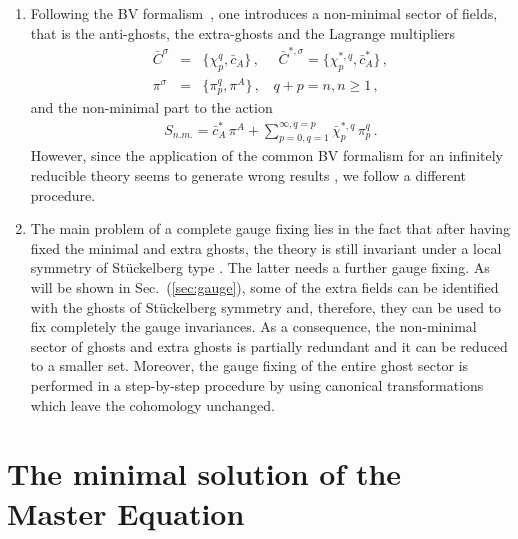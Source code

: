 \documentclass[a4paper,12pt]{article}
\begin{document}
\begin{enumerate}
\item Following the BV formalism~\cite{BV}, one introduces a non-minimal
  sector of fields, that is the anti-ghosts, the extra-ghosts and the
  Lagrange multipliers
\begin{eqnarray}
  \label{antighosts}
  \bar C^\sigma &=& \{ \chi^q_p, \bar c_A \}\,, ~~~~~~
  \bar C^{*,\sigma} = \{ \chi^{*,q}_p, \bar c^{*}_A \}\,, \nonumber \\
  \pi^\sigma &=& \{ \pi^q_p, \pi^A \}\,,~~~~q + p = n, n \geq 1\,,
\end{eqnarray}
and the non-minimal part to the action
\begin{eqnarray}
  \label{non-minimal}
  S_{n.m.} = \bar c^{*}_A \, \pi^A + \sum_{p=0,q=1}^{\infty,q=p}
  \bar\chi^{*,q}_p \, \pi^q_p \,. 
\end{eqnarray}
However, since the application of the common BV formalism for an
infinitely reducible theory seems to generate wrong results
\cite{kallosh,Bastianelli}, we follow a different procedure. 

\item The main problem of a complete gauge fixing lies in the fact 
that after having fixed the minimal and extra ghosts, 
the theory is still invariant under a local symmetry of St\"uckelberg type 
\cite{stu}. The latter needs a further gauge fixing.  
As will be shown in Sec.~(\ref{sec:gauge}), some of the 
extra fields can be identified with the ghosts of  St\"uckelberg symmetry 
and, therefore, they can be used to fix completely the gauge invariances. 
As a consequence, the non-minimal sector of ghosts 
and extra ghosts is partially redundant and it can be reduced to a 
smaller set. Moreover, the gauge fixing of the entire ghost sector 
is performed in a step-by-step procedure 
by using canonical transformations which leave the 
cohomology unchanged.


\end{enumerate}


\section{The minimal solution of the Master Equation}
\label{sec:solution}
\end{document}
